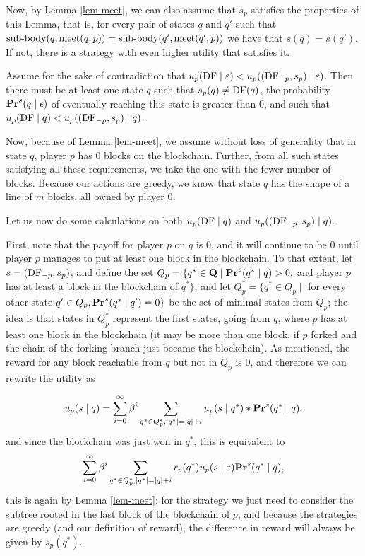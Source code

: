 Now, by Lemma \ref{lem-meet}, we can also assume that $s_p$ satisfies the properties of this Lemma, that is, for every 
pair of states $q$ and $q'$ such that ${\text{\rm sub-body}}(q,\text{\rm meet}(q,p)) = {\text{\rm sub-body}}(q',\text{\rm meet}(q',p))$ we have that $s(q) = s(q')$. If not, there is a strategy with even higher utility that satisfies it. 

Assume for the sake of contradiction that $u_p(\text{\rm DF} \mid \varepsilon) < u_p( (\text{\rm DF}_{-p},s_p) \mid \varepsilon)$. Then there must be at least one 
state $q$ such that $s_p(q) \neq \text{\rm DF}(q)$, the probability $\mathbf{Pr}^s(q \mid \epsilon)$ of eventually reaching this state is greater than $0$, and such that $u_p(\text{\rm DF} \mid q) < u_p( (\text{\rm DF}_{-p},s_p) \mid q)$. 


Now, because of Lemma \ref{lem-meet}, we assume without loss of generality that in state $q$, player $p$ has $0$ blocks on the blockchain. Further, from all such states satisfying all these requirements, we take the one with the fewer number of blocks. Because our actions are greedy, we know that state $q$ has the shape of a line of $m$ blocks, all owned by player $0$. 

Let us now do some calculations on both $u_p(\text{\rm DF} \mid q)$ and $u_p( (\text{\rm DF}_{-p},s_p) \mid q)$. 
\medskip

First, note that the payoff for player $p$ on $q$ is $0$, and it will continue to be $0$ until player $p$ manages to put at least one block in the blockchain. To that extent, let $s = (\text{\rm DF}_{-p},s_p)$, and define the set 
$Q_p = \{q^* \in \mathbf{Q} \mid \mathbf{Pr}^s(q^* \mid q) > 0, $ and player $p$ has at least a block in the blockchain of $q^* \}$, 
and let $Q^*_p=\{q^* \in Q_p \mid$ for every other state $q' \in Q_p, \mathbf{Pr}^s(q^* \mid q')=0 \}$ be the set of minimal states from $Q_p$; 
the idea is that states in $Q^*_p$ represent the first states, going from $q$, where $p$ has at least one block in the blockchain 
(it may be more than one block, if $p$ forked and the chain of the forking branch just became the blockchain). 
As mentioned, the reward for any block reachable from $q$ but not in $Q_p$ is $0$, and therefore we can rewrite the utility as

$$u_p( s \mid q) = \sum_{i=0}^\infty \beta^i \sum_{q^* \in Q^*_p, |q^*| = |q| + i} u_p(s \mid q^*) * \mathbf{Pr}^s(q^* \mid q), $$
and since the blockchain was just won in $q^*$, %
this is equivalent to 
$$ \sum_{i=0}^\infty \beta^i \sum_{q^* \in Q^*_p, |q^*| = |q| + i} r_p(q^*) u_p(s \mid \varepsilon) \mathbf{Pr}^s(q^* \mid q), $$
this is again by Lemma \ref{lem-meet}: for the strategy we just need to consider the subtree rooted in the last block of the blockchain of $p$, and 
because the strategies are greedy (and our definition of reward), the difference in reward will always be given by $s_p(q^*)$. 

